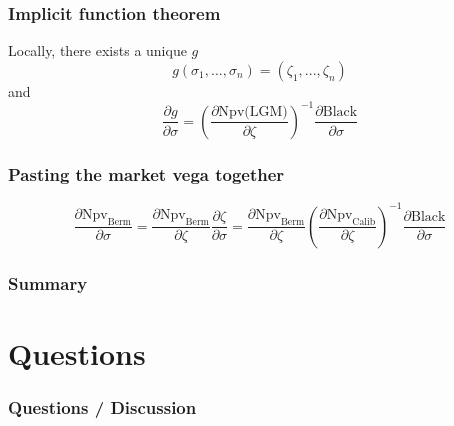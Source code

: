 \documentclass{beamer}
\begin{document}
\begin{frame}[fragile]
\frametitle{Implicit function theorem}
Locally, there exists a unique $g$
\begin{equation}
g(\sigma_1, ... , \sigma_n) = (\zeta_1, ..., \zeta_n)
\end{equation}
and
\begin{equation}
\frac{\partial g}{\partial \sigma} = \left( \frac{\partial \text{Npv(LGM)}}{\partial \zeta} \right) ^ {-1} \frac{\partial \text{Black}}{\partial \sigma}
\end{equation}
\end{frame}

\begin{frame}[fragile]
\frametitle{Pasting the market vega together}
\begin{equation*}
\frac{\partial \text{Npv}_\text{Berm}}{\partial \sigma} = \frac{\partial \text{Npv}_\text{Berm}}{\partial \zeta} \frac{\partial \zeta}{\partial \sigma} = \frac{\partial \text{Npv}_\text{Berm}}{\partial \zeta} \left( \frac{\partial \text{Npv}_\text{Calib}}{\partial \zeta} \right) ^ {-1} \frac{\partial \text{Black}}{\partial \sigma}
\end{equation*}
\end{frame}

\begin{frame}[fragile]
\frametitle{Summary}
\end{frame}

\section{Questions}

\begin{frame}[fragile]
\frametitle{Questions / Discussion}
\end{frame}
\end{document}
